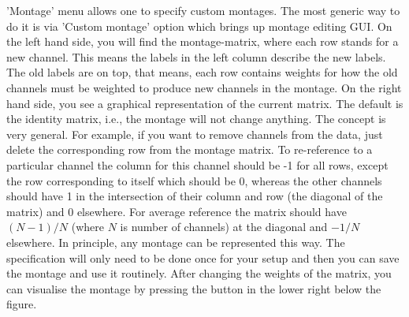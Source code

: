 'Montage' menu allows one to specify custom montages. The most generic way to do it is via 'Custom montage' option which brings up montage editing GUI. On the left hand side, you will find the montage-matrix, where each row stands for a new channel. This means the labels in the left column describe the new labels. The old labels are on top, that means, each row contains weights for how the old channels must be weighted to produce new channels in the montage. On the right hand side, you see a graphical representation of the current matrix. The default is the identity matrix, i.e., the montage will not change anything. The concept is very general. For example, if you want to remove channels from the data, just delete the corresponding row from the montage matrix. To re-reference to a particular channel the column for this channel should be -1 for all rows, except the row corresponding to itself which should be 0, whereas the other channels should have 1 in the intersection of their column and row (the diagonal of the matrix) and 0 elsewhere. For average reference the matrix should have $(N-1)/N$ (where $N$ is number of channels) at the diagonal and $-1/N$ elsewhere. In principle, any montage can be represented this way. The specification will only need to be done once for your setup and then you can save the montage and use it routinely. After changing the weights of the matrix, you can visualise the montage by pressing the button in the lower right below the figure.

